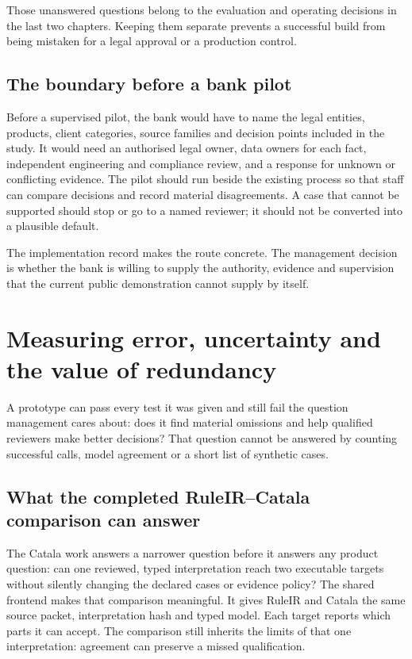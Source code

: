 \documentclass[12pt,a4paper,oneside,openany]{book}
\begin{document}
Those unanswered questions belong to the evaluation and operating decisions in
the last two chapters. Keeping them separate prevents a successful build from
being mistaken for a legal approval or a production control.

\section{The boundary before a bank pilot}

Before a supervised pilot, the bank would have to name the legal entities,
products, client categories, source families and decision points included in the
study. It would need an authorised legal owner, data owners for each fact,
independent engineering and compliance review, and a response for unknown or
conflicting evidence. The pilot should run beside the existing process so that
staff can compare decisions and record material disagreements. A case that cannot
be supported should stop or go to a named reviewer; it should not be converted
into a plausible default.

The implementation record makes the route concrete. The management decision is
whether the bank is willing to supply the authority, evidence and supervision
that the current public demonstration cannot supply by itself.

\chapter{Measuring error, uncertainty and the value of redundancy}
\label{ch:evaluation}

A prototype can pass every test it was given and still fail the question
management cares about: does it find material omissions and help qualified
reviewers make better decisions? That question cannot be answered by counting
successful calls, model agreement or a short list of synthetic cases.

\section{What the completed RuleIR--Catala comparison can answer}
\label{sec:evaluation-catala-comparison}

The Catala work answers a narrower question before it answers any product
question: can one reviewed, typed interpretation reach two executable targets
without silently changing the declared cases or evidence policy? The shared
frontend makes that comparison meaningful. It gives RuleIR and Catala the same
source packet, interpretation hash and typed model. Each target reports which
parts it can accept.
The comparison still inherits the limits of that one interpretation: agreement
can preserve a missed qualification.
\end{document}
